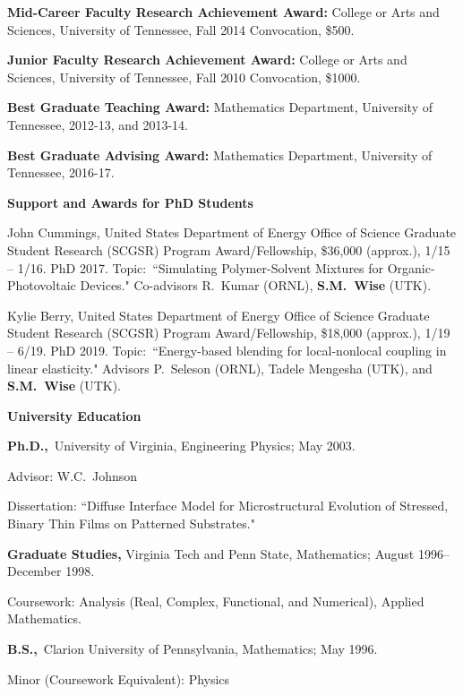 \documentclass[11pt]{letter}
\begin{document}
\begin{description}
	\item
\textbf{Mid-Career Faculty Research Achievement Award:} College or Arts and Sciences, University of Tennessee, Fall 2014 Convocation, \$500.
	\item
\textbf{Junior Faculty Research Achievement Award:} College or Arts and Sciences, University of Tennessee, Fall 2010 Convocation, \$1000.
	\item
\textbf{Best Graduate Teaching Award:} Mathematics Department, University of Tennessee, 2012-13, and 2013-14.
	\item
\textbf{Best Graduate Advising Award:} Mathematics Department, University of Tennessee, 2016-17.

    \end{description}
	
	\smallskip
	
{\LARGE\bf Support and Awards for PhD Students}
    \begin{description}
    \item
John Cummings, United States Department of Energy Office of Science Graduate Student Research (SCGSR) Program Award/Fellowship, \$36,000 (approx.), 1/15 -- 1/16. PhD 2017.  Topic:~``Simulating Polymer-Solvent Mixtures for Organic-Photovoltaic Devices." Co-advisors R.~Kumar (ORNL), \textbf{S.M.~Wise} (UTK).
    \item
Kylie Berry, United States Department of Energy Office of Science Graduate Student Research (SCGSR) Program Award/Fellowship, \$18,000 (approx.), 1/19 -- 6/19. PhD 2019.  Topic:~``Energy-based blending for local-nonlocal coupling in linear elasticity." Advisors P.~Seleson (ORNL), Tadele Mengesha (UTK), and \textbf{S.M.~Wise} (UTK).
	\end{description}
	
	\smallskip
  
{\LARGE\bf  University Education}
    \begin{description}
    \item
\textbf{Ph.D.,}~University of Virginia, Engineering Physics; May 2003.
    \begin{description}
    \item
Advisor: W.C.~Johnson
    \item
Dissertation: ``Diffuse Interface Model for Microstructural Evolution of Stressed, Binary Thin Films on Patterned Substrates."
    \end{description}
    \item
 \textbf{Graduate Studies,} Virginia Tech and Penn State, Mathematics; August 1996--December 1998.
    \begin{description}
    \item
Coursework: Analysis (Real, Complex, Functional, and Numerical), Applied Mathematics.
    \end{description}
    \item
\textbf{B.S.,}~Clarion University of Pennsylvania, Mathematics; May
1996.
    \begin{description}
    \item
Minor (Coursework Equivalent): Physics
    \end{description}
    \end{description}
	
\end{document}
